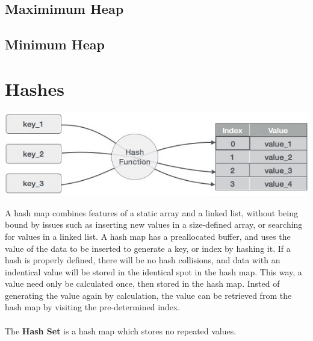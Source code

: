 \documentclass[11pt]{article}
\begin{document}
\subsection{Maximimum Heap}
\subsection{Minimum Heap}
\section{Hashes}
\begin{center}
    \includegraphics[width=300 px]{img/hash}  \\
\end{center}

A hash map combines features of a static array and a linked list, without being bound by issues such as inserting new values in a size-defined array, or searching for values in a linked list. A hash map has a preallocated buffer, and uses the value of the data to be inserted to generate a key, or index by hashing it. If a hash is properly defined, there will be no hash collisions, and data with an indentical value will be stored in the identical spot in the hash map. This way, a value need only be calculated once, then stored in the hash map. Insted of generating the value again by calculation, the value can be retrieved from the hash map by visiting the pre-determined index.
\\
\\
The \textbf{Hash Set} is a hash map which stores no repeated values.
\end{document}
